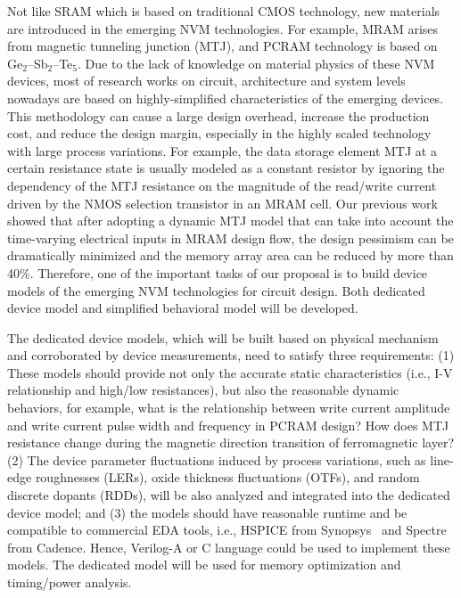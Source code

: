 Not like SRAM which is based on traditional CMOS technology, new materials are introduced in the emerging NVM technologies. For example, MRAM arises from magnetic tunneling junction (MTJ), and PCRAM technology is based on Ge$_2$--Sb$_2$--Te$_5$.
Due to the lack of knowledge on material physics of these NVM devices, most of research works on circuit, architecture and system levels nowadays are based on highly-simplified characteristics of the emerging devices. This methodology can cause a large design overhead, increase the production cost, and reduce the design margin, especially in the highly scaled technology with large process variations.  For example, the data storage element MTJ at a certain resistance state is usually modeled as a constant resistor by ignoring the dependency of the MTJ resistance on the magnitude of the read/write current driven by the NMOS selection transistor in an MRAM cell. Our previous work~\cite{Chen08} showed that after adopting a dynamic MTJ model that can take into account the time-varying electrical inputs in MRAM design flow, the design pessimism can be dramatically minimized and the memory array area can be reduced by more than 40\%. Therefore, one of the important tasks of our proposal is to build device models of the emerging NVM technologies for circuit design. Both dedicated device model and simplified behavioral model will be developed.

The dedicated device models, which will be built based on physical mechanism and corroborated by device measurements, need to satisfy three requirements: (1) These models should provide not only the accurate static characteristics (i.e., I-V relationship and high/low resistances), but also the reasonable dynamic behaviors, for example, what is the relationship between write current amplitude and write current pulse width and frequency in PCRAM design? How does MTJ resistance change during the magnetic direction transition of ferromagnetic layer? (2) The device parameter fluctuations induced by process variations, such as line-edge roughnesses (LERs), oxide thickness fluctuations (OTFs), and random discrete dopants (RDDs), will be also analyzed and integrated into the dedicated device model; and (3) the models should have reasonable runtime and be compatible to commercial EDA tools, i.e., HSPICE from Synopsys~\cite{synopsys} and Spectre from Cadence. Hence, Verilog-A or C language could be used to implement these models. The dedicated model will be used for memory optimization and timing/power analysis.

